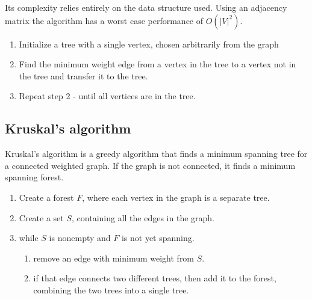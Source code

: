 \documentclass[paper=a4, fontsize=11pt]{scrartcl}
\numberwithin{equation}{section} %
\numberwithin{figure}{section} %
\numberwithin{table}{section} %
\theoremstyle{definition}
\begin{document}
Its complexity relies entirely on the data structure used. Using an adjacency matrix the algorithm has a worst case performance of \(O\left(|V|^2\right)\).
\begin{enumerate}
  \item Initialize a tree with a single vertex, chosen arbitrarily from the graph
  \item Find the minimum weight edge from a vertex in the tree to a vertex not in the tree and transfer it to the tree.
  \item Repeat step 2 - until all vertices are in the tree.
\end{enumerate}

\subsection{Kruskal's algorithm}
Kruskal's algorithm is a greedy algorithm that finds a minimum spanning tree
for a connected weighted graph.  If the graph is not connected, it finds a
minimum spanning forest.

\begin{enumerate}
\item Create a forest \(F\), where each vertex in the graph is a separate tree.
\item Create a set \(S\), containing all the edges in the graph.
\item while \(S\) is nonempty and \(F\) is not yet spanning.
  \begin{enumerate}
    \item remove an edge with minimum weight from \(S\).
    \item if that edge connects two different trees, then add it to the forest, combining the two trees into a single tree.
    \end{enumerate}
\end{enumerate}
\end{document}
